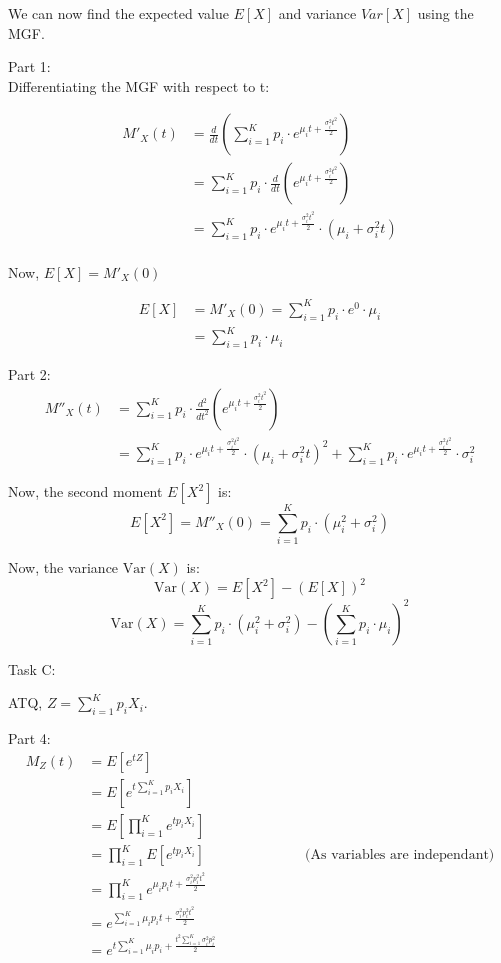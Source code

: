 \documentclass[a4paper,12pt,answers]{exam}
\begin{document}
\begin{questions}
\begin{solution}
We can now find the expected value \( E[X] \) and variance \( Var[X] \) using the MGF.

Part 1:\\
Differentiating the MGF with respect to t:

\begin{align*}
M'_X(t) &= \frac{d}{dt} \left( \sum_{i=1}^{K} p_i \cdot e^{\mu_i t + \frac{\sigma_i^2 t^2}{2}} \right)  \\
&= \sum_{i=1}^{K} p_i \cdot \frac{d}{dt} \left( e^{\mu_i t + \frac{\sigma_i^2 t^2}{2}} \right)\\
&=\sum_{i=1}^{K} p_i \cdot e^{\mu_i t + \frac{\sigma_i^2 t^2}{2}} \cdot \left( \mu_i + \sigma_i^2 t \right)\\
\end{align*}


Now, $E[X]=M'_X(0)$

\begin{align*}
E[X] &= M'_X(0) = \sum_{i=1}^{K} p_i \cdot e^{0} \cdot \mu_i \\
&= \sum_{i=1}^{K} p_i \cdot \mu_i
\end{align*}

Part 2:
\begin{align*}
M''_X(t) &= \sum_{i=1}^{K} p_i \cdot \frac{d^2}{dt^2} \left( e^{\mu_i t + \frac{\sigma_i^2 t^2}{2}} \right)\\
&= \sum_{i=1}^{K} p_i \cdot e^{\mu_i t + \frac{\sigma_i^2 t^2}{2}} \cdot \left( \mu_i + \sigma_i^2 t \right)^2 + \sum_{i=1}^{K} p_i \cdot e^{\mu_i t + \frac{\sigma_i^2 t^2}{2}} \cdot \sigma_i^2
\end{align*}

Now, the second moment \( E[X^2] \) is:
\[
E[X^2] = M''_X(0) = \sum_{i=1}^{K} p_i \cdot \left( \mu_i^2 + \sigma_i^2 \right)
\]

Now, the variance \( \text{Var}(X) \) is:
\[
\text{Var}(X) = E[X^2] - (E[X])^2
\]
\[
\text{Var}(X) = \sum_{i=1}^{K} p_i \cdot \left( \mu_i^2 + \sigma_i^2 \right) - \left( \sum_{i=1}^{K} p_i \cdot \mu_i \right)^2
\]
\end{solution}

Task C:
\begin{solution}

ATQ, $Z=\sum_{i=1}^K p_i X_i$.

Part 4:
\begin{align*}
M_Z(t)&=E[e^{tZ}]\\
&=E[e^{t\sum_{i=1}^K p_i X_i}]\\
&=E[\prod_{i=1}^K e^{t p_i X_i}]\\
&=\prod_{i=1}^K E[e^{t p_i X_i}] \hspace{3cm} \text{(As variables are independant)}\\
&=\prod_{i=1}^K e^{\mu_i p_i t + \frac{\sigma_i^2 p_i^2 t^2}{2}}\\
&=e^{\sum_{i=1}^K \mu_i p_i t + \frac{\sigma_i^2 p_i^2 t^2}{2}}\\
&=e^{ t \sum_{i=1}^K \mu_i p_i + \frac{t^2 \sum_{i=1}^K \sigma_i^2 p_i^2}{2}}\\
\end{align*}



\end{solution}
\end{questions}
\end{document}
